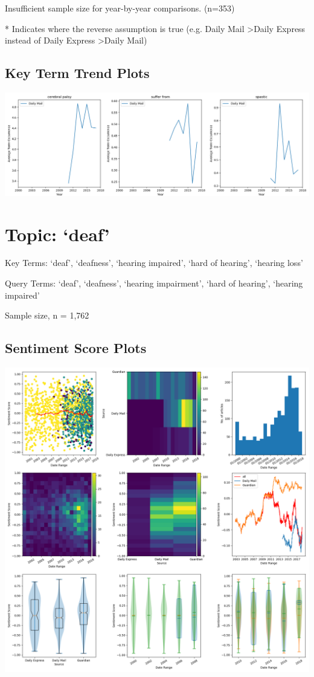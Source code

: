 \documentclass{report}
\begin{document}
\noindent Insufficient sample size for year-by-year comparisons. (n=353)

\noindent ** Indicates where the reverse assumption is true (e.g. Daily Mail \textgreater\space Daily Express instead of Daily Express \textgreater\space Daily Mail)

\subsection{Key Term Trend Plots}
\includegraphics[width=\textwidth]{raw/cerebral-palsy-terms.png}

\newpage
\section{Topic: `deaf'}
Key Terms: `deaf', `deafness', `hearing impaired', `hard of hearing', `hearing loss'

\noindent Query Terms: `deaf', `deafness', `hearing impairment', `hard of hearing', `hearing impaired'

\noindent Sample size, n = 1,762

\subsection{Sentiment Score Plots}
\includegraphics[width=\textwidth]{raw/deaf.png}
\end{document}
